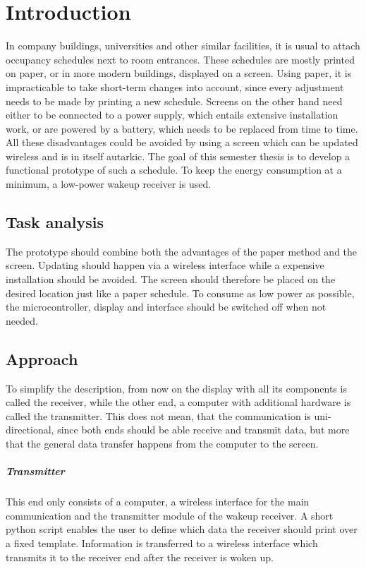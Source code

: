 \chapter{Introduction}
In company buildings, universities and other similar facilities, it is usual to attach occupancy schedules next to room entrances.
These schedules are mostly printed on paper, or in more modern buildings, displayed on a screen.
Using paper, it is impracticable to take short-term changes into account, since every adjustment needs to be made by printing a new schedule.
Screens on the other hand need either to be connected to a power supply, which entails extensive installation work, or are powered by a battery, which needs to be replaced from time to time.
All these disadvantages could be avoided by using a screen which can be updated wireless and is in itself autarkic.
The goal of this semester thesis is to develop a functional prototype of such a schedule.
To keep the energy consumption at a minimum, a low-power wakeup receiver is used.

\section{Task analysis}
The prototype should combine both the advantages of the paper method and the screen.
Updating should happen via a wireless interface while a expensive installation should be avoided.
The screen should therefore be placed on the desired location  just like a paper schedule.
To consume as low power as possible, the microcontroller, display and interface should be switched off when not needed.

\section{Approach}
To simplify the description, from now on the display with all its components is called the receiver, while the other end, a computer with additional hardware is called the transmitter.
This does not mean, that the communication is uni-directional, since both ends should be able receive and transmit data, but more that the general data transfer happens from the computer to the screen.

\paragraph{Transmitter}
This end only consists of a computer, a wireless interface for the main communication and the transmitter module of the wakeup receiver.
A short python script enables the user to define which data the receiver should print over a fixed template.
Information is transferred to a wireless interface which transmits it to the receiver end after the receiver is woken up.

